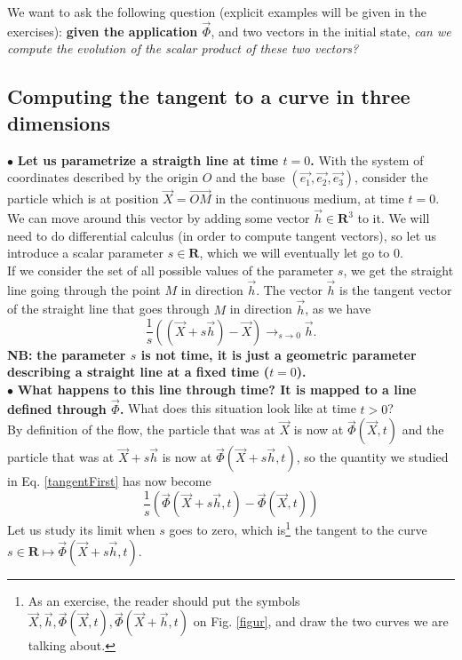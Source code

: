 \documentclass[DIV=12]{article}
\begin{document}
We want to ask the following question (explicit examples will be given in the exercises): {\bf{given the application $\vec{\Phi}$}},
  and two vectors in the initial state, {\emph{can we compute the evolution of the scalar product of these two vectors?}}


\subsection{Computing the tangent to a curve in three dimensions}
 $\bullet$ {\bf{Let us parametrize a straigth line at time $t=0$.}}
 With the system of coordinates described by the origin $O$ and the base  $(\vec{e_1}, \vec{e_2}, \vec{e_3})$, 
 consider the particle which is at position $\vec{X}= \vec{OM}$ in the continuous medium, at time $t=0$.
 We can move around this vector by adding some vector $\vec{h}\in \mathbf{R}^3$ to it.
 We will need  to do differential calculus (in order to compute tangent vectors), so let us introduce a scalar parameter
 $s\in \mathbf{R}$, which we will eventually let go to 0.\\

If we consider the set of all possible values of the parameter $s$, we get the straight 
 line going through the point $M$ in direction $\vec{h}$. 
The vector $\vec{h}$ is the tangent vector of the straight line that
 goes through $M$ in direction $\vec{h}$, as we have
\begin{equation}
 \frac{1}{s}\left( (\vec{X}+ s\vec{h} ) - \vec{X}\right)\longrightarrow_{s\rightarrow 0} \vec{h}.
 \label{tangentFirst}
\end{equation}
{\bf{NB:}} {\bf{the parameter $s$ is not time, it is just a geometric parameter describing 
 a straight line at a fixed time ($t=0$).}}\\

 $\bullet$ {\bf{ What happens to this line through time? It is mapped to a line defined through $\vec{\Phi}$.}}
 What does this situation look like at time $t>0$?\\
By definition of the flow, the  particle that was at $\vec{X}$ 
 is now at $\vec{\Phi}(\vec{X},t)$ and the particle that was at $\vec{X}+ s\vec{h}$ 
 is now at $\vec{\Phi}(\vec{X}+ s\vec{h},t)$, 
 so the quantity we studied in Eq. \ref{tangentFirst}
 has now become
\begin{equation}
 \frac{1}{s}\left( \vec{\Phi}(\vec{X}+ s\vec{h},t) -  \vec{\Phi}(\vec{X},t) \right)
 \label{accrFinal}
\end{equation}
 Let us study its limit when $s$ goes to zero, which is\footnote{As an exercise, the 
 reader should put the symbols $\vec{X}, \vec{h}, \vec{\Phi}(\vec{X},t),\vec{\Phi}(\vec{X}+\vec{h},t)$ on Fig. \ref{figur}, and draw the two curves we 
 are talking about.}  the tangent 
 to the curve $s \in \mathbf{R} \mapsto   \vec{\Phi}(\vec{X}+ s\vec{h},t)$.\\
 
\end{document}
